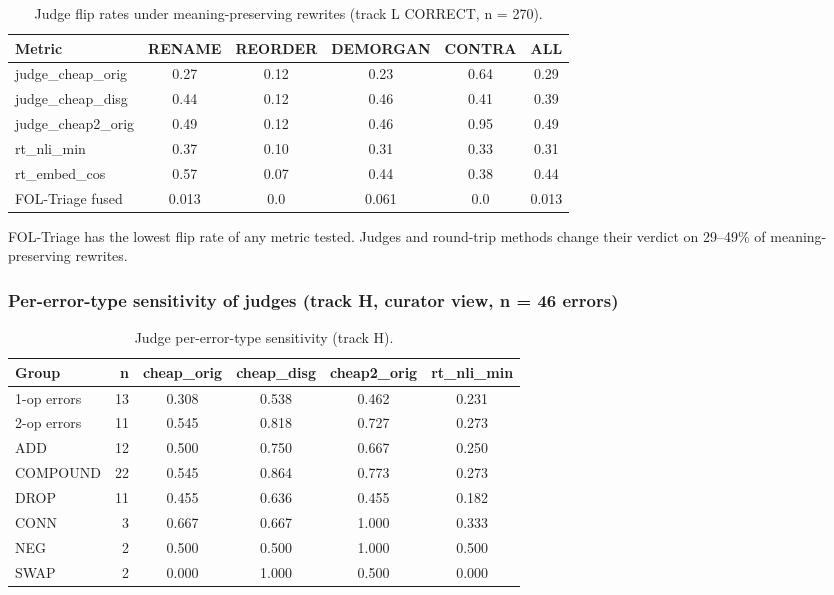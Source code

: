\documentclass[11pt,letterpaper]{article}
\begin{document}
\begin{table}[!htbp]
\centering
\caption{Judge flip rates under meaning-preserving rewrites (track L CORRECT, n = 270).}
\label{tab:judge_invariance}
\begin{tabular}{lccccc}
\toprule
Metric & RENAME & REORDER & DEMORGAN & CONTRA & ALL \\
\midrule
judge\_cheap\_orig & 0.27 & 0.12 & 0.23 & 0.64 & 0.29 \\
judge\_cheap\_disg & 0.44 & 0.12 & 0.46 & 0.41 & 0.39 \\
judge\_cheap2\_orig & 0.49 & 0.12 & 0.46 & 0.95 & 0.49 \\
rt\_nli\_min & 0.37 & 0.10 & 0.31 & 0.33 & 0.31 \\
rt\_embed\_cos & 0.57 & 0.07 & 0.44 & 0.38 & 0.44 \\
FOL-Triage fused & 0.013 & 0.0 & 0.061 & 0.0 & 0.013 \\
\bottomrule
\end{tabular}
\end{table}

FOL-Triage has the lowest flip rate of any metric tested. Judges and round-trip methods change their verdict on 29--49\% of meaning-preserving rewrites.

\subsubsection{Per-error-type sensitivity of judges (track H, curator view, n = 46 errors)}

\begin{table}[!htbp]
\centering
\caption{Judge per-error-type sensitivity (track H).}
\label{tab:judge_pertype}
\begin{tabular}{lrcccc}
\toprule
Group & n & cheap\_orig & cheap\_disg & cheap2\_orig & rt\_nli\_min \\
\midrule
1-op errors & 13 & 0.308 & 0.538 & 0.462 & 0.231 \\
2-op errors & 11 & 0.545 & 0.818 & 0.727 & 0.273 \\
ADD & 12 & 0.500 & 0.750 & 0.667 & 0.250 \\
COMPOUND & 22 & 0.545 & 0.864 & 0.773 & 0.273 \\
DROP & 11 & 0.455 & 0.636 & 0.455 & 0.182 \\
CONN & 3 & 0.667 & 0.667 & 1.000 & 0.333 \\
NEG & 2 & 0.500 & 0.500 & 1.000 & 0.500 \\
SWAP & 2 & 0.000 & 1.000 & 0.500 & 0.000 \\
\bottomrule
\end{tabular}
\end{table}
\end{document}
